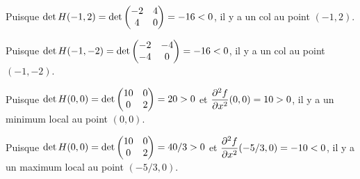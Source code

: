 {Puisque $\displaystyle \det H(-1,2)
= \det \begin{pmatrix} -2 & 4 \\ 4 & 0 \end{pmatrix} = - 16 < 0$,
il y a un col au point $(-1,2)$.

Puisque $\displaystyle \det H(-1,-2)
= \det \begin{pmatrix} -2 & -4 \\ -4 & 0 \end{pmatrix} = - 16 < 0$,
il y a un col au point $(-1,-2)$.

Puisque $\displaystyle \det H(0,0)
= \det \begin{pmatrix} 10 & 0 \\ 0 & 2 \end{pmatrix} = 20 > 0$ et
$\displaystyle \frac{\partial^{2} f}{\partial x^{2}}(0,0) = 10 >0$, il y a un
minimum local au point $(0,0)$.

Puisque $\displaystyle \det H(0,0)
= \det \begin{pmatrix} 10 & 0 \\ 0 & 2 \end{pmatrix} = 40/3 > 0$ et
$\displaystyle \frac{\partial^{2} f}{\partial x^{2}}(-5/3,0) = -10 < 0$, il y a un maximum
local au point $(-5/3,0)$.
}

